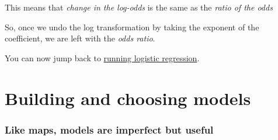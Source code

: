 \documentclass[]{article}
\theoremstyle{definition}
\theoremstyle{definition}
\theoremstyle{definition}
\theoremstyle{remark}
\begin{document}
This means that \emph{change in the log-odds} is the same as the
\emph{ratio of the odds}

So, once we undo the log transformation by taking the exponent of the
coefficient, we are left with the \emph{odds ratio}.

You can now jump back to \protect\hyperlink{logistic-regression}{running
logistic regression}.

\section{Building and choosing models}\label{comparison-and-selection}

\subsubsection*{Like maps, models are imperfect but
useful}\label{like-maps-models-are-imperfect-but-useful}
\end{document}
